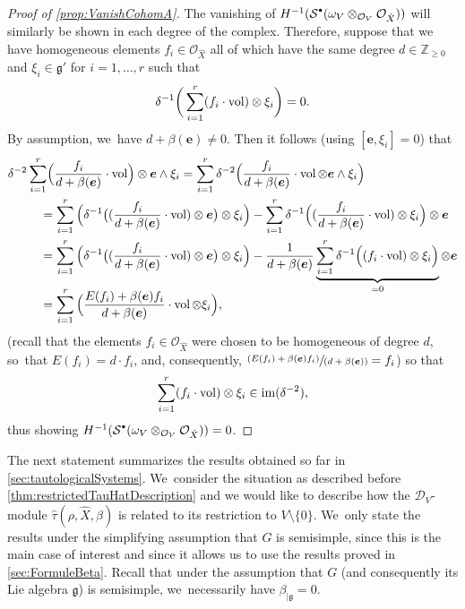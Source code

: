 \documentclass[JEP,XML,SOM,Unicode,published]{cedram}
\let\mathds\mathbb
\newcommand{\pspfrac}[2]{\sfrac{(#1)}{(#2)}}
\newcommand{\sbullet}{{\scriptscriptstyle\bullet}}
\newcommand{\csbullet}{{\raisebox{1pt}{$\sbullet$}}}
\newcommand{\bme}{{\boldsymbol{e}}}
\newcommand{\dZ}{{\mathds Z}}\let\mbz\dZ\let\Z\dZ
\newcommand{\cD}{\mathscr{D}}
\newcommand{\cO}{\mathcal{O}}\let\O\cO
\newcommand{\cS}{\mathcal{S}}
\newcommand{\frg}{\mathfrak{g}}
\DeclareMathOperator{\vol}{\textup{vol}}
\begin{document}
\begin{proof}[Proof of \cref{prop:VanishCohomA}]
The vanishing of $H^{-1}(\cS^{\csbullet}(\omega_V\otimes_{\cO_V} \cO_{\hat{X}}))$ will similarly be shown in each degree of the complex. Therefore, suppose that we have homogeneous elements $f_i\in\cO_{\hat{X}}$ all of which have the same degree $d\in\dZ_{\geq 0}$ and $\xi_i\in \frg'$ for $i=1,\ldots,r$ such that
\[
\delta^{-1}\bigg(
\sum_{i=1}^r (f_i\cdot \vol)\otimes \xi_i\bigg)=0.
\]
By assumption, we~have $d+\beta(\bme)\neq 0$. Then it follows (using $[\bme, \xi_i]=0$) that
\begin{align*}
\delta^{-2}\sum_{i=1}^r&
\Bigl(\frac{f_i}{d+\beta(\bme)}\cdot\vol \Bigr)\otimes \bme\wedge \xi_i=
\sum_{i=1}^r
\delta^{-2}\Big(
\frac{f_i}{d+\beta(\bme)}\cdot\vol\otimes \bme\wedge \xi_i\Big)\\
&\hspace*{-2mm}=
\sum_{i=1}^r\Big(\delta^{-1}\big((\frac{f_i}{d+\beta(\bme)}\cdot\vol)\otimes \bme\big)\otimes \xi_i\Big) -
\sum_{i=1}^r\delta^{-1}\Big((\frac{f_i}{d+\beta(\bme)}\cdot\vol)\otimes \xi_i\Big)\otimes \bme
\\
&\hspace*{-2mm}=
\sum_{i=1}^r\Big(\delta^{-1}\big((\frac{f_i}{d+\beta(\bme)}\cdot\vol)\otimes \bme\big)\otimes \xi_i\Big)
-\frac{1}{d+\beta(\bme)}
\underbrace{\sum_{i=1}^r\delta^{-1}\Big((f_i\cdot\vol)\otimes \xi_i\Big)}_{=0}\otimes \bme
\\[-8pt]
&\hspace*{-2mm}=
\sum_{i=1}^r \Big(\frac{E(f_i)+\beta(\bme)f_i}{d+\beta(\bme)}\cdot \vol\otimes \xi_i
\Big),
\end{align*}
(recall that the elements $f_i\in \cO_{\hat{X}}$ were chosen to be homogeneous of degree $d$, so~that $E(f_i)=d\cdot f_i$, and, consequently, $\pspfrac{E(f_i)+\beta(\bme)f_i}{d+\beta(\bme)}=f_i$) so that
\[
\sum_{i=1}^r (f_i\cdot \vol)\otimes \xi_i\in\textup{im}(\delta^{-2}),
\]
thus showing $H^{-1}(\cS^{\csbullet}(\omega_V\otimes_{\cO_V}\cO_{\hat{X}}))=0$.
\end{proof}

The next statement summarizes the results obtained so far in \cref{sec:tautologicalSystems}. We~consider the situation as described before \cref{thm:restrictedTauHatDescription} and we would like to describe how the $\cD_V$\nobreakdash-mod\-ule $\hat{\tau}(\rho, \hat{X},\beta)$ is related to its restriction to $V\setminus\{0\}$. We~only state the results under the simplifying assumption that $G$ is semisimple, since this is the main case of interest and since it allows us to use the results proved in \cref{sec:FormuleBeta}.
Recall that under the assumption that $G$ (and consequently its Lie algebra $\frg$) is semisimple, we~necessarily have $\beta_{|\frg} = 0$.
\end{document}
